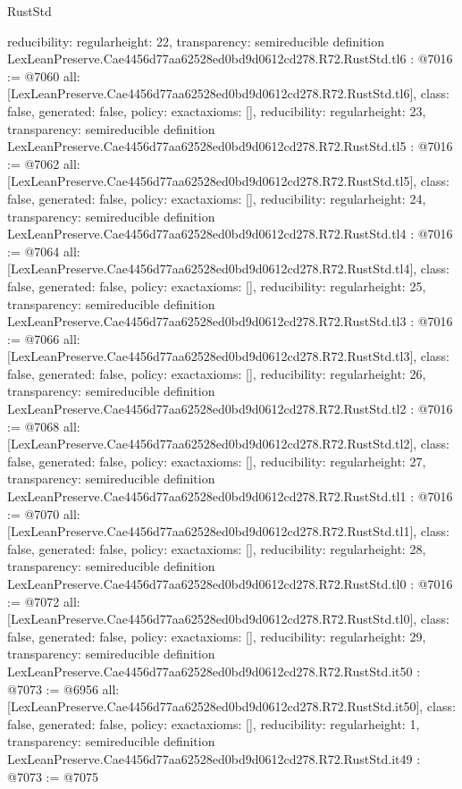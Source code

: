 \begin{lexlean}{RustStd}
\begin{coremodule}
{  reducibility: regular{height: 22},
  transparency: semireducible
}
definition LexLeanPreserve.Cae4456d77aa62528ed0bd9d0612cd278.R72.RustStd.tl6 : @7016 := @7060 {
  all: [LexLeanPreserve.Cae4456d77aa62528ed0bd9d0612cd278.R72.RustStd.tl6],
  class: false,
  generated: false,
  policy: exact{axioms: []},
  reducibility: regular{height: 23},
  transparency: semireducible
}
definition LexLeanPreserve.Cae4456d77aa62528ed0bd9d0612cd278.R72.RustStd.tl5 : @7016 := @7062 {
  all: [LexLeanPreserve.Cae4456d77aa62528ed0bd9d0612cd278.R72.RustStd.tl5],
  class: false,
  generated: false,
  policy: exact{axioms: []},
  reducibility: regular{height: 24},
  transparency: semireducible
}
definition LexLeanPreserve.Cae4456d77aa62528ed0bd9d0612cd278.R72.RustStd.tl4 : @7016 := @7064 {
  all: [LexLeanPreserve.Cae4456d77aa62528ed0bd9d0612cd278.R72.RustStd.tl4],
  class: false,
  generated: false,
  policy: exact{axioms: []},
  reducibility: regular{height: 25},
  transparency: semireducible
}
definition LexLeanPreserve.Cae4456d77aa62528ed0bd9d0612cd278.R72.RustStd.tl3 : @7016 := @7066 {
  all: [LexLeanPreserve.Cae4456d77aa62528ed0bd9d0612cd278.R72.RustStd.tl3],
  class: false,
  generated: false,
  policy: exact{axioms: []},
  reducibility: regular{height: 26},
  transparency: semireducible
}
definition LexLeanPreserve.Cae4456d77aa62528ed0bd9d0612cd278.R72.RustStd.tl2 : @7016 := @7068 {
  all: [LexLeanPreserve.Cae4456d77aa62528ed0bd9d0612cd278.R72.RustStd.tl2],
  class: false,
  generated: false,
  policy: exact{axioms: []},
  reducibility: regular{height: 27},
  transparency: semireducible
}
definition LexLeanPreserve.Cae4456d77aa62528ed0bd9d0612cd278.R72.RustStd.tl1 : @7016 := @7070 {
  all: [LexLeanPreserve.Cae4456d77aa62528ed0bd9d0612cd278.R72.RustStd.tl1],
  class: false,
  generated: false,
  policy: exact{axioms: []},
  reducibility: regular{height: 28},
  transparency: semireducible
}
definition LexLeanPreserve.Cae4456d77aa62528ed0bd9d0612cd278.R72.RustStd.tl0 : @7016 := @7072 {
  all: [LexLeanPreserve.Cae4456d77aa62528ed0bd9d0612cd278.R72.RustStd.tl0],
  class: false,
  generated: false,
  policy: exact{axioms: []},
  reducibility: regular{height: 29},
  transparency: semireducible
}
definition LexLeanPreserve.Cae4456d77aa62528ed0bd9d0612cd278.R72.RustStd.it50 : @7073 := @6956 {
  all: [LexLeanPreserve.Cae4456d77aa62528ed0bd9d0612cd278.R72.RustStd.it50],
  class: false,
  generated: false,
  policy: exact{axioms: []},
  reducibility: regular{height: 1},
  transparency: semireducible
}
definition LexLeanPreserve.Cae4456d77aa62528ed0bd9d0612cd278.R72.RustStd.it49 : @7073 := @7075 {
}
\end{coremodule}
\end{lexlean}
